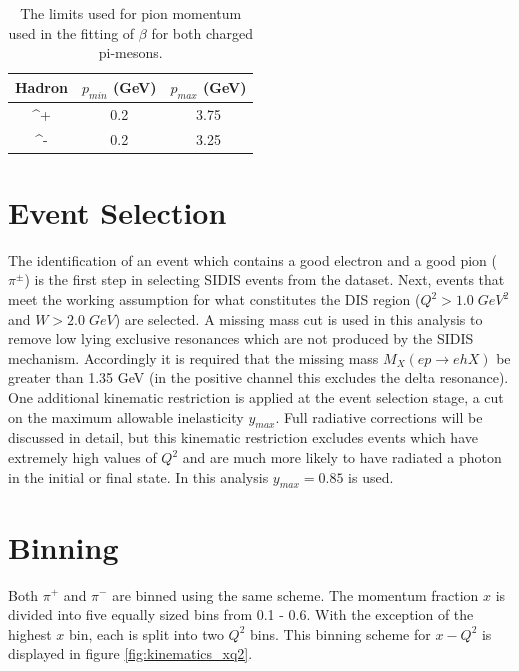 \begin{table}
	\label{table:hadron-id-nathan}
  \centering
  \begin{tabular}{c|c|c}
    Hadron & $p_{min}$ (GeV) & $p_{max}$ (GeV) \\
    \hline 
	\pi^+ & 0.2 & 3.75 \\
	\pi^- & 0.2 & 3.25 \\
  \end{tabular}
  \caption[Limits for pion momentum used in fitting $\beta$.]{The limits used for pion momentum used in the fitting of $\beta$ for both charged pi-mesons.}
\end{table} 
 
\section{Event Selection}
The identification of an event which contains a good electron and a good pion ($\pi^{\pm}$) is the first step in selecting SIDIS events from the dataset.  Next, events that meet the working assumption for what constitutes the DIS region ($Q^2 > 1.0 \; GeV^2$ and $W > 2.0 \; GeV$) are selected.  A missing mass cut is used in this analysis to remove low lying exclusive resonances which are not produced by the SIDIS mechanism.  Accordingly it is required that the missing mass $M_X (e p \rightarrow e h X)$ be greater than 1.35 GeV (in the positive channel this excludes the delta resonance).  \\

One additional kinematic restriction is applied at the event selection stage, a cut on the maximum allowable inelasticity $y_{max}$.  Full radiative corrections will be discussed in detail, but this kinematic restriction excludes events which have extremely high values of $Q^2$ and are much more likely to have radiated a photon in the initial or final state.  In this analysis $y_{max} = 0.85$ is used.  

\section{Binning}
Both $\pi^+$ and $\pi^-$ are binned using the same scheme.  The momentum fraction $x$ is divided into five equally sized bins from 0.1 - 0.6.  With the exception of the highest $x$ bin, each is split into two $Q^2$ bins.  This binning scheme for $x-Q^2$ is displayed in figure \ref{fig:kinematics_xq2}.  \\


